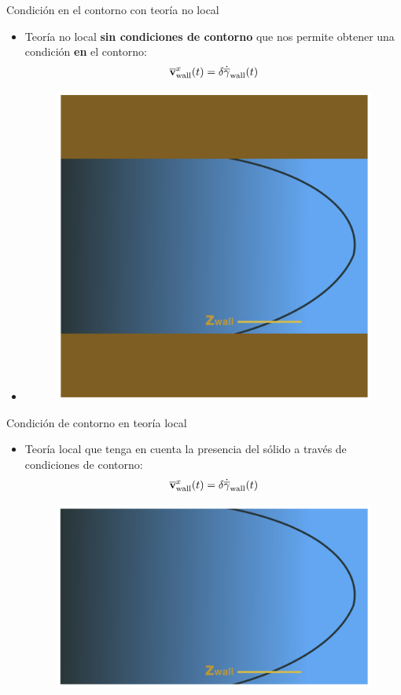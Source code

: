 \documentclass{beamer}
\begin{document}
\begin{frame}{Condición en el contorno con teoría no local}
  \begin{itemize}
    \item[] \alert{Teoría no local} \textbf{sin condiciones de contorno} que nos permite obtener una condición {\bf en} el contorno:  
      \begin{align}
      \overline{\bf v}^x_{\rm wall}(t) = \delta\dot{\overline{\gamma}}_{\rm wall}(t)
        \nonumber
      \end{align}
\item[]
  \begin{figure}
    \includegraphics[width=0.45\linewidth]{condiciones_contorno_paredes_recorte}
  \end{figure}
  \end{itemize}
\end{frame}

  \begin{frame}{Condición de contorno en teoría local}
    \begin{itemize}
      \item[] \alert{Teoría local} que tenga en cuenta la presencia del sólido a través de condiciones de contorno:
        \begin{align}
      \overline{\bf v}^x_{\rm wall}(t) = \delta\dot{\overline{\gamma}}_{\rm wall}(t)
        \nonumber
        \end{align}
  \begin{figure}
    \includegraphics[width=0.55\linewidth]{condicion_contorno_recorte}
  \end{figure}
\end{itemize}
\end{frame}
\end{document}
